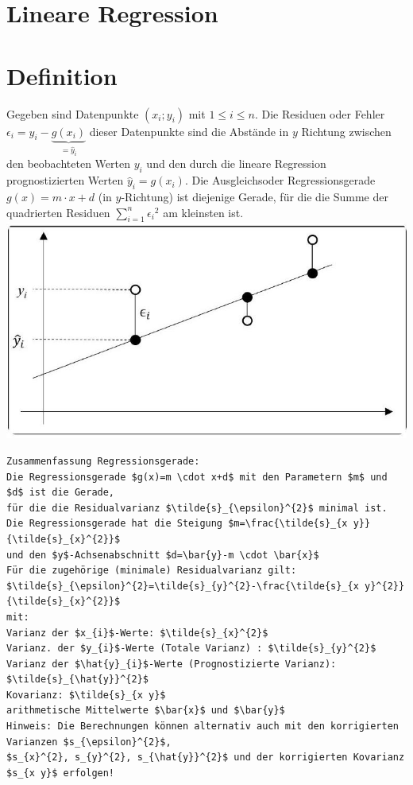 \documentclass[10pt]{article}
\begin{document}
\section*{Lineare Regression}
\section*{Definition}
Gegeben sind Datenpunkte $\left(x_{i} ; y_{i}\right)$ mit $1 \leq i \leq n$. Die Residuen oder Fehler $\epsilon_{i}=y_{i}-\underbrace{g\left(x_{i}\right)}_{=\hat{y}_{i}}$ dieser Datenpunkte sind die Abstände in $y$ Richtung zwischen den beobachteten Werten $y_{i}$ und den durch die lineare Regression prognostizierten Werten $\hat{y}_{i}=g\left(x_{i}\right)$. Die Ausgleichsoder Regressionsgerade $g(x)=m \cdot x+d$ (in $y$-Richtung) ist diejenige Gerade, für die die Summe der quadrierten Residuen $\sum_{i=1}^{n} \epsilon_{i}{ }^{2}$ am kleinsten ist.\\
\includegraphics[width=\linewidth]{images/2025_01_02_5da43d4a2289c00b2d0dg-1}

\begin{verbatim}
Zusammenfassung Regressionsgerade:
Die Regressionsgerade $g(x)=m \cdot x+d$ mit den Parametern $m$ und $d$ ist die Gerade,
für die die Residualvarianz $\tilde{s}_{\epsilon}^{2}$ minimal ist.
Die Regressionsgerade hat die Steigung $m=\frac{\tilde{s}_{x y}}{\tilde{s}_{x}^{2}}$
und den $y$-Achsenabschnitt $d=\bar{y}-m \cdot \bar{x}$
Für die zugehörige (minimale) Residualvarianz gilt: $\tilde{s}_{\epsilon}^{2}=\tilde{s}_{y}^{2}-\frac{\tilde{s}_{x y}^{2}}{\tilde{s}_{x}^{2}}$
mit:
Varianz der $x_{i}$-Werte: $\tilde{s}_{x}^{2}$
Varianz. der $y_{i}$-Werte (Totale Varianz) : $\tilde{s}_{y}^{2}$
Varianz der $\hat{y}_{i}$-Werte (Prognostizierte Varianz): $\tilde{s}_{\hat{y}}^{2}$
Kovarianz: $\tilde{s}_{x y}$
arithmetische Mittelwerte $\bar{x}$ und $\bar{y}$
Hinweis: Die Berechnungen können alternativ auch mit den korrigierten Varianzen $s_{\epsilon}^{2}$,
$s_{x}^{2}, s_{y}^{2}, s_{\hat{y}}^{2}$ und der korrigierten Kovarianz $s_{x y}$ erfolgen!
\end{verbatim}
\end{document}
